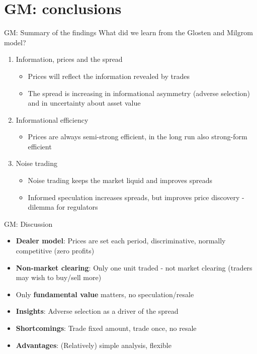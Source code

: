 \documentclass[english,10pt
,aspectratio=169
]{beamer}
\begin{document}
\section{GM: conclusions}


\begin{frame}{GM: Summary of the findings}
	What did we learn from the Glosten and Milgrom model?
	\begin{enumerate}
		\item Information, prices and the spread
		\begin{itemize}
			\item Prices will reflect the information revealed by trades
			\item The spread is increasing in informational asymmetry (adverse selection) and in uncertainty about asset value
		\end{itemize}
		\item Informational efficiency
		\begin{itemize}
			\item Prices are always semi-strong efficient, in the long run also strong-form efficient
		\end{itemize}
		\item Noise trading
		\begin{itemize}
			\item Noise trading keeps the market liquid and improves spreads
			\item Informed speculation increases spreads, but improves price discovery - dilemma for regulators
		\end{itemize}
	\end{enumerate}
\end{frame}


\begin{frame}[label=overview]{GM: Discussion}
\begin{itemize}
	\item \textbf{Dealer model}: Prices are set each period, discriminative, normally competitive (zero profits)
	\item \textbf{Non-market clearing}: Only one unit traded  - not market clearing (traders may wish to buy/sell more)
	\item Only \textbf{fundamental value} matters,  no speculation/resale
\end{itemize}
\begin{itemize}
	\item \textbf{Insights}: Adverse selection as a driver of the spread
	\item \textbf{Shortcomings}: Trade fixed amount, trade once, no resale
	\item \textbf{Advantages}: (Relatively) simple analysis, flexible %
\end{itemize}
\end{frame}
\end{document}
